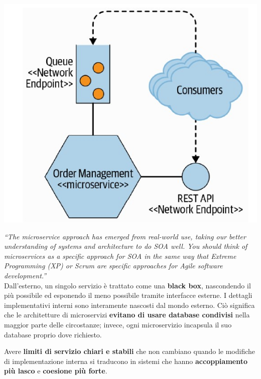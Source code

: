 \begin{center}
    \includegraphics[scale = 0.4]{Images/SOA/WhatAreMicroservices.jpg}
\end{center}

\emph{“The microservice approach has emerged from real-world
use, taking our better understanding of systems and
architecture to do SOA well. You should think of
microservices as a specific approach for SOA in the same
way that Extreme Programming (XP) or Scrum are
specific approaches for Agile software development.”}\\

Dall'esterno, un singolo servizio è trattato come una \textbf{black box}, nascondendo il più possibile ed esponendo il meno possibile tramite interfacce esterne. I dettagli implementativi interni sono interamente nascosti dal mondo esterno. Ciò significa che le architetture di microservizi \textbf{evitano di usare database condivisi} nella maggior parte delle circostanze; invece, ogni microservizio incapsula il suo database proprio dove richiesto.

Avere \textbf{limiti di servizio chiari e stabili} che non cambiano quando
le modifiche di implementazione interna si traducono in sistemi che hanno
\textbf{accoppiamento più lasco} e \textbf{coesione più forte}.\\

